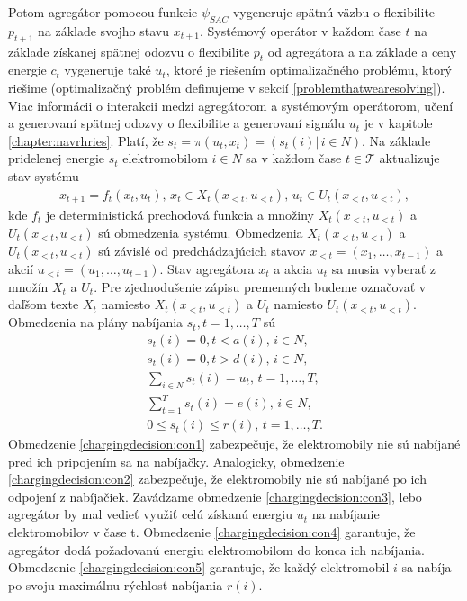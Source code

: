 Potom agregátor pomocou funkcie $\psi_{SAC}$ vygeneruje spätnú väzbu o  flexibilite $p_{t+1}$ na základe svojho stavu $x_{t+1}$. Systémový operátor v každom čase $t$ na základe získanej spätnej odozvu o flexibilite $p_{t}$ od agregátora a na základe a ceny energie $c_{t}$ vygeneruje také $u_{t}$, ktoré je riešením optimalizačného problému, ktorý riešime (optimalizačný problém definujeme v sekcií \ref{problemthatwearesolving}). Viac informácii o interakcii medzi agregátorom a systémovým operátorom, učení a generovaní spätnej odozvy o flexibilite a generovaní signálu $u_{t}$ je v kapitole \ref{chapter:navrhries}. Platí, že $s_{t} = \pi(u_{t}, x_{t}) = (s_{t}(i) | \, i \in N)$.  Na základe pridelenej energie $s_{t}$ elektromobilom $i \in N$ sa v každom čase $t \in \mathcal{T}$ aktualizuje stav systému
\begin{gather}
    x_{t + 1} = f_{t}(x_{t}, u_{t}), \, x_{t} \in X_{t}(x_{<t}, u_{<t}), \, u_{t} \in U_{t}(x_{<t}, u_{<t}),
\end{gather}
kde $f_{t}$ je deterministická prechodová funkcia a  množiny $X_{t}(x_{<t}, u_{<t})$ a $U_{t}(x_{<t}, u_{<t})$ sú obmedzenia systému. Obmedzenia $X_{t}(x_{<t}, u_{<t})$ a $U_{t}(x_{<t}, u_{<t})$ sú závislé od predchádzajúcich stavov $x_{<t} = (x_{1}, \dots, x_{t - 1})$ a akcií $u_{<t} = (u_{1}, \dots, u_{t - 1})$. Stav agregátora $x_{t}$ a akcia $u_{t}$ sa musia vyberať z množín $X_{t}$ a $U_{t}$. Pre zjednodušenie zápisu premenných budeme označovať v daľšom texte $X_{t}$ namiesto $X_{t}(x_{<t}, u_{<t})$ a $U_{t}$ namiesto $U_{t}(x_{<t}, u_{<t})$.
Obmedzenia na plány nabíjania $s_{t}, t = 1, \dots, T$ sú
\begin{gather}
\label{chargingdecision:con1} 
s_{t}(i) = 0,t < a(i), \, i \in N, \\
\label{chargingdecision:con2} 
s_{t}(i) = 0,t > d(i), \, i \in N, \\
\label{chargingdecision:con3}
\sum_{i \in N} s_{t}(i) = u_{t}, \, t = 1, \dots, T,  \\
\label{chargingdecision:con4} 
\sum_{t=1}^{T} s_{t}(i) = e(i), \, i  \in N, \\
\label{chargingdecision:con5} 
0 \leq s_{t}(i) \leq r(i), \, t = 1, \dots, T.
\end{gather}
Obmedzenie \eqref{chargingdecision:con1} zabezpečuje, že elektromobily nie sú nabíjané pred ich pripojením sa na nabíjačky. Analogicky, obmedzenie \eqref{chargingdecision:con2} zabezpečuje, že elektromobily nie sú nabíjané po ich odpojení z nabíjačiek. Zavádzame obmedzenie \eqref{chargingdecision:con3}, lebo agregátor by mal vedieť využiť celú získanú energiu $u_{t}$ na nabíjanie elektromobilov v čase t.  Obmedzenie \eqref{chargingdecision:con4} garantuje, že agregátor dodá požadovanú energiu elektromobilom do konca ich nabíjania.  Obmedzenie \eqref{chargingdecision:con5} garantuje, že každý elektromobil $i$ sa nabíja po svoju maximálnu rýchlosť nabíjania $r(i)$.
